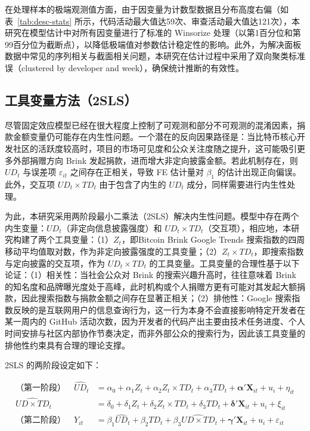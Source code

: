 \documentclass[
    type = master, %
    degree = professional,        %
    decl-page,  %
    twoside,                %
    fontset = fandol %
  ]{njuthesis}
\begin{document}
在处理样本的极端观测值方面，由于因变量为计数型数据且分布高度右偏（如表~\ref{tab:desc-stats} 所示，代码活动最大值达59次、审查活动最大值达121次），本研究在模型估计中对所有因变量进行了标准的 Winsorize 处理（以第1百分位和第99百分位为截断点），以降低极端值对参数估计稳定性的影响。此外，为解决面板数据中常见的序列相关与截面相关问题，本研究在估计过程中采用了双向聚类标准误（clustered by developer and week），确保统计推断的有效性。

\subsection{工具变量方法（2SLS）}
\label{sec:iv-method}

尽管固定效应模型已经在很大程度上控制了可观测和部分不可观测的混淆因素，捐款金额变量仍可能存在内生性问题。一个潜在的反向因果路径是：当比特币核心开发社区的活跃度较高时，项目的市场可见度和公众关注度随之提升，这可能吸引更多外部捐赠方向 Brink 发起捐款，进而增大非定向披露金额。若此机制存在，则 $\mathit{UD}_t$ 与误差项 $\varepsilon_{it}$ 之间存在正相关，导致 FE 估计量对 $\beta_1$ 的估计出现正向偏误。此外，交互项 $\mathit{UD}_t \times \mathit{TD}_t$ 由于包含了内生的 $\mathit{UD}_t$ 成分，同样需要进行内生性处理。

为此，本研究采用两阶段最小二乘法（2SLS）解决内生性问题。模型中存在两个内生变量：$\mathit{UD}_t$（非定向信息披露强度）和 $\mathit{UD}_t \times \mathit{TD}_t$（交互项），相应地，本研究构建了两个工具变量：（1）$Z_t$，即Bitcoin Brink Google Trends 搜索指数的四周移动平均值取对数，作为非定向披露强度的工具变量；（2）$Z_t \times \mathit{TD}_t$，即搜索指数与定向披露的交互项，作为 $\mathit{UD}_t \times \mathit{TD}_t$ 的工具变量。工具变量的合理性基于以下论证：（1）相关性：当社会公众对 Brink 的搜索兴趣升高时，往往意味着 Brink 的知名度和品牌曝光度处于高峰，此时机构或个人捐赠方更有可能对其发起大额捐款，因此搜索指数与捐款金额之间存在显著正相关；（2）排他性：Google 搜索指数反映的是互联网用户的信息查询行为，这一行为本身不会直接影响特定开发者在某一周内的 GitHub 活动次数，因为开发者的代码产出主要由技术任务进度、个人时间安排与社区内部协作节奏决定，而非外部公众的搜索行为，因此该工具变量的排他性约束具有合理的理论支撑。

2SLS 的两阶段设定如下：

\begin{align}
\text{（第一阶段）}\quad
    \widehat{UD}_t
        &= \alpha_0 + \alpha_1 Z_t
           + \alpha_2 Z_t \times TD_t
           + \alpha_3 TD_t
           + \boldsymbol{\alpha}' \mathbf{X}_{it} + u_i + \eta_{it}
\label{eq:first-stage} \\[0.5em]
    \widehat{UD \times TD}_t
        &= \delta_0 + \delta_1 Z_t
           + \delta_2 Z_t \times TD_t
           + \delta_3 TD_t
           + \boldsymbol{\delta}' \mathbf{X}_{it} + u_i + \xi_{it}
\label{eq:first-stage-2} \\[0.5em]
\text{（第二阶段）}\quad
    Y_{it}
        &= \beta_1 \widehat{UD}_t
           + \beta_2 TD_t
           + \beta_3 \widehat{UD \times TD}_t
           + \boldsymbol{\gamma}' \mathbf{X}_{it}
           + u_i + \varepsilon_{it}
\label{eq:second-stage}
\end{align}
\end{document}
